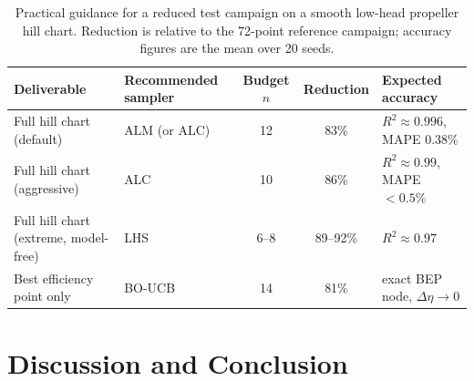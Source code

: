 \documentclass[preprint,12pt]{elsarticle}
\begin{document}
\begin{table}[t]
\centering
\caption{Practical guidance for a reduced test campaign on a smooth low-head
propeller hill chart. Reduction is relative to the 72-point reference campaign;
accuracy figures are the mean over 20 seeds.}
\label{tab:guidance}
\small
\begin{tabular}{@{}p{3.1cm}p{2.1cm}ccp{3.4cm}@{}}
\toprule
Deliverable & Recommended sampler & Budget $n$ & Reduction & Expected accuracy \\
\midrule
Full hill chart (default) & ALM (or ALC) & 12 & 83\% & $R^2 \approx 0.996$, MAPE $0.38\%$ \\
Full hill chart (aggressive) & ALC & 10 & 86\% & $R^2 \approx 0.99$, MAPE $< 0.5\%$ \\
Full hill chart (extreme, model-free) & LHS & 6--8 & 89--92\% & $R^2 \approx 0.97$ \\
Best efficiency point only & BO-UCB & 14 & 81\% & exact BEP node, $\Delta\eta \to 0$ \\
\bottomrule
\end{tabular}
\end{table}

\section{Discussion and Conclusion}\label{sec:discussion}
\end{document}
